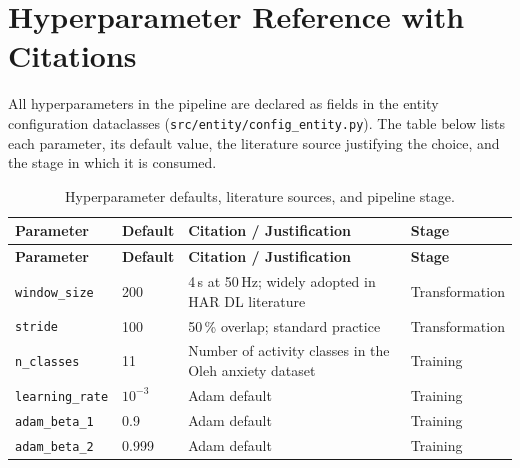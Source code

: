 \chapter{Hyperparameter Reference with Citations}
\label{app:hyperparameters}

All hyperparameters in the pipeline are declared as fields in the entity
configuration dataclasses (\texttt{src/entity/config\_entity.py}).
The table below lists each parameter, its default value, the literature source
justifying the choice, and the stage in which it is consumed.

\begin{longtable}{p{}p{}p{}p{}}
  \caption{Hyperparameter defaults, literature sources, and pipeline stage.}
  \label{tab:hyperparameters} \\
  \toprule
  \textbf{Parameter} & \textbf{Default} & \textbf{Citation / Justification}
    & \textbf{Stage} \\
  \midrule
  \endfirsthead
  \toprule
  \textbf{Parameter} & \textbf{Default} & \textbf{Citation / Justification}
    & \textbf{Stage} \\
  \midrule
  \endhead
  \bottomrule
  \endfoot

  \texttt{window\_size}
    & 200
    & 4\,s at 50\,Hz; widely adopted in HAR DL literature
      \citep{bao2004activity,chen2021deep}
    & Transformation \\[4pt]

  \texttt{stride}
    & 100
    & 50\,\% overlap; standard practice \citep{mannini2010machine}
    & Transformation \\[4pt]

  \texttt{n\_classes}
    & 11
    & Number of activity classes in the Oleh anxiety dataset
    & Training \\[4pt]

  \texttt{learning\_rate}
    & $10^{-3}$
    & Adam default \citep{kingma2015adam}
    & Training \\[4pt]

  \texttt{adam\_beta\_1}
    & 0.9
    & Adam default \citep{kingma2015adam}
    & Training \\[4pt]

  \texttt{adam\_beta\_2}
    & 0.999
    & Adam default \citep{kingma2015adam}
    & Training \\[4pt]


\end{longtable}
